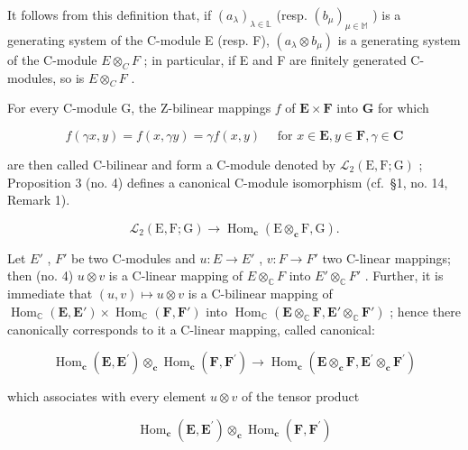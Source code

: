 It follows from this definition that, if \((a_{\lambda})_{\lambda\in\mathbb{L}}\) (resp. \((b_{\mu})_{\mu\in\mathbb{M}}\) ) is a generating system of the C-module E (resp. F), \((a_{\lambda}\otimes b_{\mu})\) is a generating system of the C-module \(E\otimes_{C}F\) ; in particular, if E and F are finitely generated C-modules, so is \(E\otimes_{C}F\) .

For every C-module G, the Z-bilinear mappings \(f\) of \(\mathbf{E} \times \mathbf{F}\) into \(\mathbf{G}\) for which

\[
f (\gamma x, y) = f (x, \gamma y) = \gamma f (x, y) \quad \text { for } x \in \mathbf {E}, y \in \mathbf {F}, \gamma \in \mathbf {C}\tag{9}
\]

are then called C-bilinear and form a C-module denoted by \(\mathcal{L}_2(\mathrm{E},\mathrm{F};\mathrm{G})\) ; Proposition 3 (no. 4) defines a canonical C-module isomorphism (cf.~§1, no. 14, Remark 1).

\[
\mathcal {L} _ {2} (\mathrm{E}, \mathrm{F}; \mathrm{G}) \rightarrow \operatorname{Hom} _ {\mathbf {c}} (\mathrm{E} \otimes_ {\mathbf {c}} \mathrm{F}, \mathrm{G}).\tag{10}
\]

Let \(E'\) , \(F'\) be two C-modules and \(u: E \to E'\) , \(v: F \to F'\) two C-linear mappings; then (no. 4) \(u \otimes v\) is a C-linear mapping of \(E \otimes_{\mathbb{C}} F\) into \(E' \otimes_{\mathbb{C}} F'\) . Further, it is immediate that \((u, v) \mapsto u \otimes v\) is a C-bilinear mapping of \(\operatorname{Hom}_{\mathbb{C}}(\mathbf{E}, \mathbf{E}') \times \operatorname{Hom}_{\mathbb{C}}(\mathbf{F}, \mathbf{F}')\) into \(\operatorname{Hom}_{\mathbb{C}}(\mathbf{E} \otimes_{\mathbb{C}} \mathbf{F}, \mathbf{E}' \otimes_{\mathbb{C}} \mathbf{F}')\) ; hence there canonically corresponds to it a C-linear mapping, called canonical:

\[
\operatorname{Hom} _ {\mathbf {c}} (\mathbf {E}, \mathbf {E} ^ {\prime}) \otimes_ {\mathbf {c}} \operatorname{Hom} _ {\mathbf {c}} (\mathbf {F}, \mathbf {F} ^ {\prime}) \to \operatorname{Hom} _ {\mathbf {c}} (\mathbf {E} \otimes_ {\mathbf {c}} \mathbf {F}, \mathbf {E} ^ {\prime} \otimes_ {\mathbf {c}} \mathbf {F} ^ {\prime})\tag{11}
\]

which associates with every element \(u \otimes v\) of the tensor product

\[
\operatorname{Hom} _ {\mathbf {c}} (\mathbf {E}, \mathbf {E} ^ {\prime}) \otimes_ {\mathbf {c}} \operatorname{Hom} _ {\mathbf {c}} (\mathbf {F}, \mathbf {F} ^ {\prime})
\]

